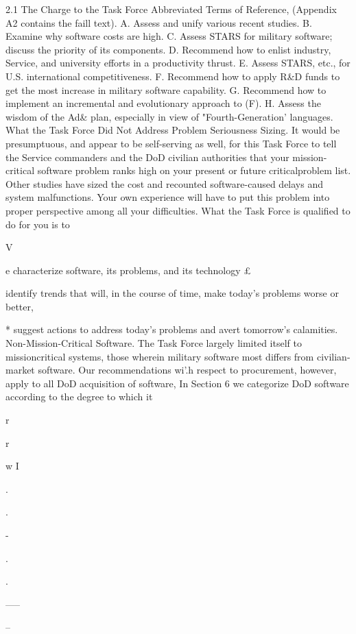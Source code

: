 \documentclass[12pt]{article}
\begin{document}
2.1 The Charge to the Task Force
Abbreviated Terms of Reference, (Appendix A2 contains the faill text).
A. Assess and unify various recent studies.
B. Examine why software costs are high.
C. Assess STARS for military software; discuss the priority of its components.
D. Recommend how to enlist industry, Service, and university efforts in a productivity
thrust.
E. Assess STARS, etc., for U.S. international competitiveness.
F. Recommend how to apply R\&D funds to get the most increase in military software
capability.
G. Recommend how to implement an incremental and evolutionary approach to (F).
H. Assess the wisdom of the Ad\& plan, especially in view of "Fourth-Generation' languages.
What the Task Force Did Not Address
Problem Seriousness Sizing. It would be presumptuous, and appear to be self-serving
as well, for this Task Force to tell the Service commanders and the DoD civilian authorities
that your mission-critical software problem ranks high on your present or future criticalproblem list. Other studies have sized the cost and recounted software-caused delays and
system malfunctions. Your own experience will have to put this problem into proper
perspective among all your difficulties.
What the Task Force is qualified to do for you is to

V

e characterize software, its problems, and its technology
£

identify trends that will, in the course of time, make today's problems worse or
better,

* suggest actions to address today's problems and avert tomorrow's calamities.
Non-Mission-Critical Software.
The Task Force largely limited itself to missioncritical systems, those wherein military software most differs from civilian-market software.
Our recommendations wi'.h respect to procurement, however, apply to all DoD acquisition
of software, In Section 6 we categorize DoD software according to the degree to which it


r

r

w I

.

.

-

.

.

-----

--
\end{document}
